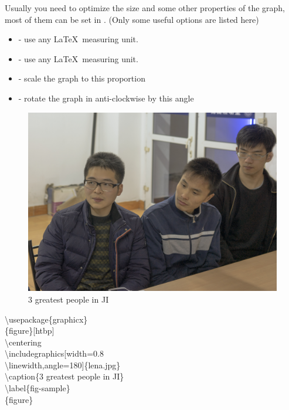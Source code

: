 \documentclass{beamer}
\newcommand{\samplebegin}[1]{\structure{\textbackslash begin}\{#1\}}
\newcommand{\sampleend}[1]{\structure{\textbackslash end}\{#1\}}
\newcommand{\samplecommand}[1]{\alert{\textbackslash #1}}
\begin{document}
\begin{frame}
	Usually you need to optimize the size and some other properties of the graph, most of them can be set in . (Only some useful options are listed here)
	\begin{itemize}
		\item {} - use any \LaTeX\ measuring unit.
		\item {} - use any \LaTeX\ measuring unit.
		\item {} - scale the graph to this proportion
		\item {} - rotate the graph in anti-clockwise by this angle 
	\end{itemize}
	\begin{minipage}{0.45\linewidth}
		\begin{example}
			\begin{figure}[htbp]
				\centering
				\includegraphics[width=0.8\linewidth,angle=180]{sample.jpg}
				\caption{3 greatest people in JI}
				\label{fig-sample}		
			\end{figure}
		\end{example}
	\end{minipage}
	\hfill
	\begin{minipage}{0.5\linewidth}
		\samplecommand{usepackage}\{graphicx\}\\
		\samplebegin{figure}[htbp]\\
		\phantom{\qquad}\samplecommand{centering}\\
		\phantom{\qquad}\samplecommand{includegraphics}[width=0.8\\
		\samplecommand{linewidth},angle=180]\{lena.jpg\}\\
		\phantom{\qquad}\samplecommand{caption}\{3 greatest people in JI\}\\
		\phantom{\qquad}\samplecommand{label}\{fig-sample\}\\
		\sampleend{figure}
	\end{minipage}
\end{frame}
\end{document}
